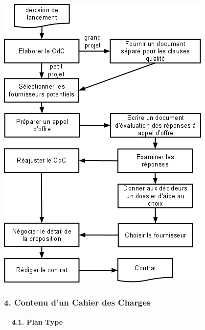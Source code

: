 \documentclass{article}
\begin{document}
\bigskip


\includegraphics[width=10.663cm,height=15.081cm]{BP22020Aide20C3A020la20rC3A9daction20dun20CdC20Logiciel-img2.png}



\bigskip

\subsubsection[4. Contenu d’un Cahier des Charges]{4. Contenu d’un
Cahier des Charges}
\paragraph[\ \ 4.1. Plan Type]{\ \ 4.1. Plan Type}

\bigskip
\end{document}

